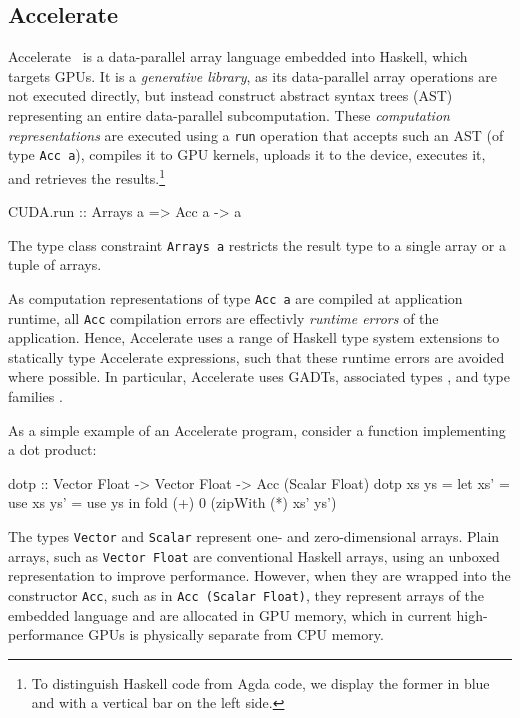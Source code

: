 \documentclass{llncs}
\begin{document}
\subsection{Accelerate}
\label{sec:accelerate}

Accelerate~\cite{ChakravartyKellerLeeMcdonellGrover2011} is a
data-parallel array language embedded into Haskell, which targets
GPUs. It is a \emph{generative library}, as its data-parallel array
operations are not executed directly, but instead construct abstract
syntax trees (AST) representing an entire data-parallel
subcomputation. These \emph{computation representations} are executed
using a \verb+run+ operation that accepts such an AST (of type
\verb+Acc a+), compiles it to GPU kernels, uploads it to the device,
executes it, and retrieves the results.\footnote{To distinguish
  Haskell code from Agda code, we display the former in blue and with
  a vertical bar on the left side.}
%
\begin{hcode}
CUDA.run :: Arrays a => Acc a -> a
\end{hcode}
%
The type class constraint \verb+Arrays a+ restricts the result type to a single array or a tuple of arrays.

As computation representations of type \verb+Acc a+ are compiled at application runtime, all \verb+Acc+ compilation errors are effectivly \emph{runtime errors} of the application. Hence, Accelerate uses a range of Haskell type system extensions to statically type Accelerate expressions, such that these runtime errors are avoided where possible. In particular, Accelerate uses GADTs\cite{PeytonJonesVytiniotisWeirichWashburn2006}, associated types
\cite{ChakravartyKellerJones2005}, and type families
\cite{SchrijversPeytonJonesChakravartySulzmann2008}. 

As a simple example of an Accelerate program, consider a function implementing a dot product:
%
\begin{hcode}
dotp :: Vector Float -> Vector Float -> Acc (Scalar Float)
dotp xs ys = let xs' = use xs
                 ys' = use ys
             in  fold (+) 0 (zipWith (*) xs' ys')
\end{hcode}
%
The types \verb+Vector+ and \verb+Scalar+ represent one- and zero-dimensional
arrays. Plain arrays, such as \verb+Vector Float+ are conventional Haskell arrays, using an unboxed representation to improve performance. However, when they are wrapped into the constructor \verb+Acc+, such as in \verb+Acc (Scalar Float)+, they represent arrays of the embedded language and are allocated in GPU memory, which in current high-performance GPUs is physically separate from CPU memory.
\end{document}
